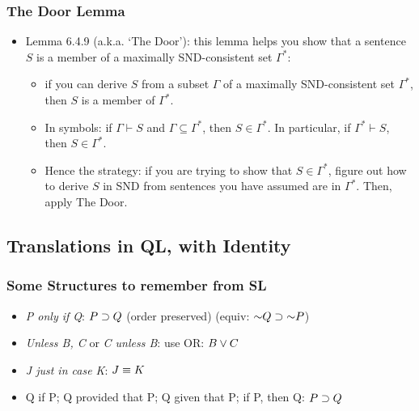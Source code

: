 \begin{frame}
\frametitle{The Door Lemma}

\begin{itemize}[<+->]

\item Lemma 6.4.9 (a.k.a. `The Door'): this lemma helps you show that a sentence $S$ is a member of a maximally SND-consistent set $\Gamma^{\ast}$: 
\begin{itemize}

\item if you can derive $S$ from a subset $\Gamma$ of a maximally SND-consistent set $\Gamma^{\ast}$, then $S$ is a member of $\Gamma^{\ast}$.

\item In symbols: if $\Gamma \vdash S$ and $\Gamma \subseteq \Gamma^{\ast} $, then $S\in\Gamma^{\ast} $. In particular, if $\Gamma^{\ast} \vdash S$, then $S\in\Gamma^{\ast} $.

\item Hence the strategy: if you are trying to show that  $S\in\Gamma^{\ast} $, figure out how to derive $S$ in SND from sentences you have assumed are in $\Gamma^{\ast} $. Then, apply The Door. 

\end{itemize}



\end{itemize}
\end{frame}




\subsection{Translations in QL, with Identity}

\begin{frame}
\frametitle{Some Structures to remember from SL}

\begin{itemize}[<+->]

\item \emph{P only if Q}: $P \supset Q$ (order preserved) (equiv: $\enot Q \eif \enot P$)

\item \emph{Unless B, C} or \emph{C unless B}: use OR: $B \vee C$

\item \emph{J just in case K}: $J \equiv K$ 

\item Q if P; Q provided that P; Q given that P; if P, then Q: $P \supset Q$



\end{itemize}
\end{frame}


